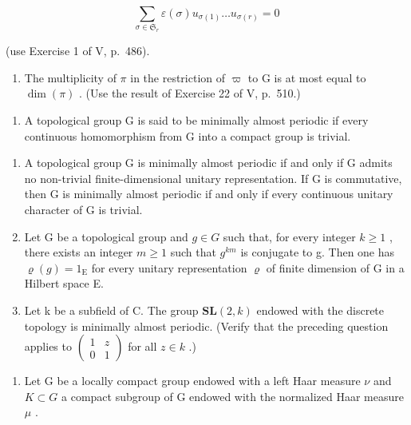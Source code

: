 \[
\sum_ {\sigma \in \mathfrak {S} _ {r}} \varepsilon (\sigma) u _ {\sigma (1)} \dots u _ {\sigma (r)} = 0
\]

  (use Exercise 1 of V, p.~486).

\begin{enumerate}
\def\labelenumi{\alph{enumi})}
\setcounter{enumi}{3}
\tightlist
\item
  The multiplicity of \(\pi\) in the restriction of \(\varpi\) to G is at most equal to \(\dim(\pi)\) . (Use the result of Exercise 22 of V, p.~510.)
\end{enumerate}

\begin{enumerate}
\def\labelenumi{\arabic{enumi})}
\setcounter{enumi}{23}
\tightlist
\item
  A topological group G is said to be minimally almost periodic if every continuous homomorphism from G into a compact group is trivial.
\end{enumerate}

\begin{enumerate}
\def\labelenumi{\alph{enumi})}
\item
  A topological group G is minimally almost periodic if and only if G admits no non-trivial finite-dimensional unitary representation. If G is commutative, then G is minimally almost periodic if and only if every continuous unitary character of G is trivial.
\item
  Let G be a topological group and \(g \in G\) such that, for every integer \(k \geqslant 1\) , there exists an integer \(m \geqslant 1\) such that \(g^{km}\) is conjugate to g. Then one has \(\varrho(g) = 1_{\mathrm{E}}\) for every unitary representation \(\varrho\) of finite dimension of G in a Hilbert space E.
\item
  Let k be a subfield of C. The group \(\mathbf{SL}(2,k)\) endowed with the discrete topology is minimally almost periodic. (Verify that the preceding question applies to \(\begin{pmatrix}1 & z \\ 0 & 1\end{pmatrix}\) for all \(z \in k\) .)
\end{enumerate}

\begin{enumerate}
\def\labelenumi{\arabic{enumi})}
\setcounter{enumi}{24}
\tightlist
\item
  Let G be a locally compact group endowed with a left Haar measure \(\nu\) and \(K \subset G\) a compact subgroup of G endowed with the normalized Haar measure \(\mu\) .
\end{enumerate}

